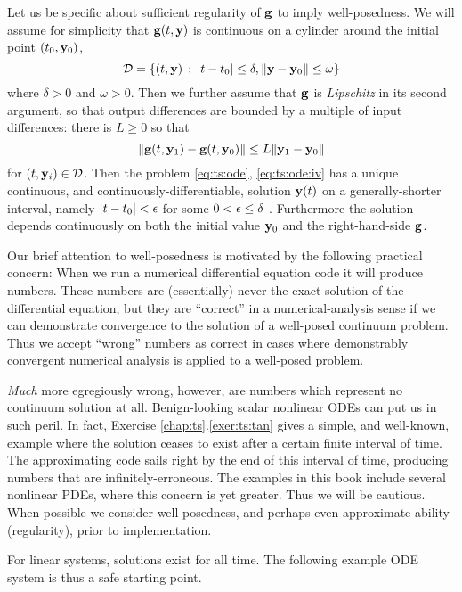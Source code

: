 Let us be specific about sufficient regularity of $\mathbf{g}$ to imply well-posedness.  We will assume for simplicity that $\mathbf{g}(t,\mathbf{y})$ is continuous on a cylinder around the initial point $(t_0,\mathbf{y}_0)$,
   $$\mathcal{D} = \{(t,\mathbf{y}) \,:\, |t-t_0| \le \delta, \|\mathbf{y} - \mathbf{y}_0\| \le \omega\}$$
where $\delta > 0$ and $\omega > 0$.  Then we further assume that $\mathbf{g}$ is \emph{Lipschitz} in its second argument, so that output differences are bounded by a multiple of input differences: there is $L\ge 0$ so that
\begin{equation}
\|\mathbf{g}(t,\mathbf{y}_1) - \mathbf{g}(t,\mathbf{y}_0)\| \le L \|\mathbf{y}_1-\mathbf{y}_0\|  \label{eq:ts:glipschitz}
\end{equation}
for $(t,\mathbf{y}_i) \in \mathcal{D}$.  Then the problem \eqref{eq:ts:ode}, \eqref{eq:ts:ode:iv} has a unique continuous, and continuously-differentiable, solution $\mathbf{y}(t)$ on a generally-shorter interval, namely $|t-t_0|<\epsilon$ for some $0 < \epsilon \le \delta$ \citep[section 17.5]{HirschSmaleDevaney2004}.  Furthermore the solution depends continuously on both the initial value $\mathbf{y}_0$ and the right-hand-side $\mathbf{g}$.

Our brief attention to well-posedness is motivated by the following practical concern:  When we run a numerical differential equation code it will produce numbers.  These numbers are (essentially) never the exact solution of the differential equation, but they are ``correct'' in a numerical-analysis sense if we can demonstrate convergence to the solution of a well-posed continuum problem.  Thus we accept ``wrong'' numbers as correct in cases where demonstrably convergent numerical analysis is applied to a well-posed problem.

\emph{Much} more egregiously wrong, however, are numbers which represent no continuum solution at all.  Benign-looking scalar nonlinear ODEs can put us in such peril.  In fact, Exercise \ref{chap:ts}.\ref{exer:ts:tan} gives a simple, and well-known, example where the solution ceases to exist after a certain finite interval of time.  The approximating code sails right by the end of this interval of time, producing numbers that are infinitely-erroneous.  The examples in this book include several nonlinear PDEs, where this concern is yet greater.  Thus we will be cautious.  When possible we consider well-posedness, and perhaps even approximate-ability (regularity), prior to implementation.

For linear systems, solutions exist for all time.  The following example ODE system is thus a safe starting point.

